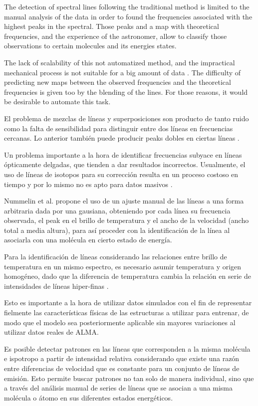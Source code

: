 \documentclass[twocolumn, draft]{emulateapj}
\begin{document}
The detection of spectral lines following the traditional method is limited to the manual analysis of the data in order to found the frequencies associated with the highest peaks in the spectral. Those peaks and a map with theoretical frequencies, and the experience of the astronomer, allow to classify those observations to certain molecules and its energies states.

The lack of scalability of this not automatized method, and the impractical mechanical process is not suitable for a big amount of data \citep{Schilke2001}. The difficulty of predicting new maps between the observed frequencies and the theoretical frequencies is given too by the blending of the lines. For those reasons, it would be desirable to automate this task.

El problema de mezclas de líneas y superposiciones son producto de tanto ruido como la falta de sensibilidad  para distinguir entre dos líneas en frecuencias cercanas. Lo anterior también puede producir peaks dobles en ciertas líneas \citep{Cernicharo2013}.

Un problema importante a la hora de identificar frecuencias subyace en líneas ópticamente delgadas, que tienden a dar resultados incorrectos. Usualmente, el uso de líneas de isotopos para su corrección resulta en un proceso costoso en tiempo y por lo mismo no es apto para datos masivos \citep{Schilke2001}.

Nummelin et al. \citep{Nummelin1998} propone el uso de un ajuste manual de las líneas a una forma arbitraria dada por una gausiana, obteniendo por cada línea su frecuencia observada, el peak en el brillo de temperatura y el ancho de la velocidad (ancho total a media altura), para así proceder con la identificación de la línea al asociarla con una molécula en cierto estado de energía. 

Para la identificación de líneas considerando las relaciones entre brillo de temperatura en un mismo espectro, es necesario asumir temperatura y origen homogéneo, dado que la diferencia de temperatura cambia la relación en serie de intensidades de líneas hiper-finas \citep{Nummelin2000}. 

Esto es importante a la hora de utilizar datos simulados con el fin de representar fielmente las características físicas de las estructuras a utilizar para entrenar, de modo que el modelo sea posteriormente aplicable sin mayores variaciones al utilizar datos reales de ALMA.

Es posible detectar patrones en las líneas que corresponden a la misma molécula e ispotropo a partir de intensidad relativa considerando que existe una razón entre diferencias de velocidad que es constante para un conjunto de líneas de emisión. Esto permite buscar patrones no tan solo de manera individual, sino que a través del análisis manual de series de líneas que se asocian a una misma molécula o átomo en sus diferentes estados energéticos. 
\end{document}
